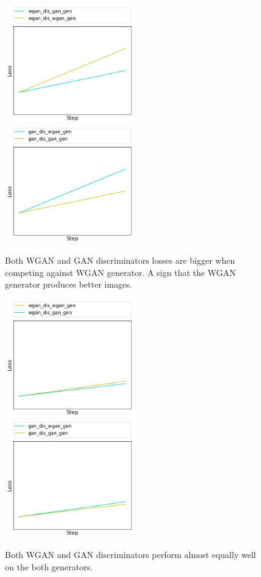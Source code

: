 	\begin{figure}[h!] 
		\includegraphics[width=0.5\textwidth]{figures/ex/wgan_wins_wgan_dis}
		\includegraphics[width=0.5\textwidth]{figures/ex/wgan_wins_gan_dis}
		\caption{Both WGAN and GAN discriminators losses are bigger when competing against WGAN generator. A sign that the WGAN generator produces better images.}
		\label{fig:cd_wgan_wins}
	\end{figure}
	\begin{figure}[h!]
		\includegraphics[width=0.5\textwidth]{figures/ex/equal_wgan_dis}
		\includegraphics[width=0.5\textwidth]{figures/ex/equal_gan_dis}
		\caption{Both WGAN and GAN discriminators perform almost equally well on the both generators.}
		\label{fig:cd_equal}
	\end{figure}
	
